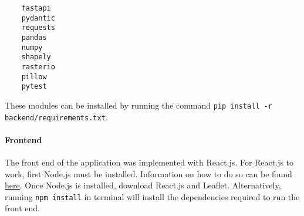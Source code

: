 \documentclass{article}
\begin{document}
\begin{verbatim}
    fastapi
    pydantic
    requests
    pandas
    numpy
    shapely
    rasterio
    pillow
    pytest
\end{verbatim}

\noindent These modules can be installed by running the command \texttt{pip install -r backend/requirements.txt}.

\paragraph{Frontend} The front end of the application was implemented with React.js. For React.js to work, first Node.js must be installed. Information on how to do so can be found \href{https://nodejs.org/en/learn/getting-started/how-to-install-nodejs}{here}. Once Node.js is installed, download React.js and Leaflet. Alternatively, running \texttt{npm install} in terminal will install the dependencies required to run the front end.
\end{document}
